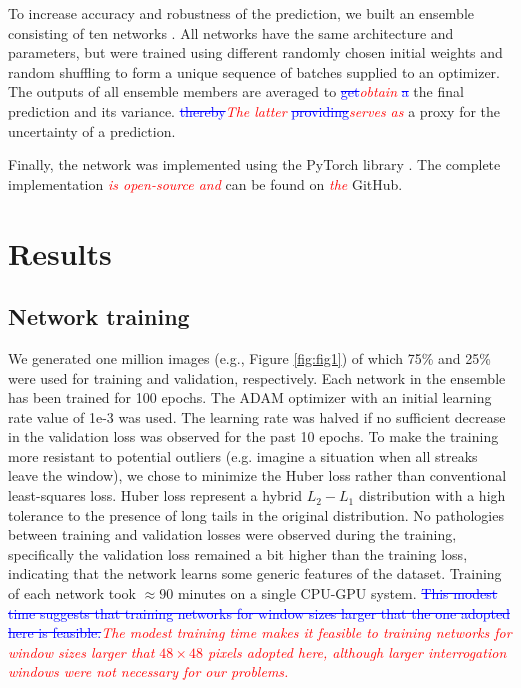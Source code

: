 \documentclass{svjour3}                     %
\newcommand{\new}[1]{\textit{\textcolor{red}{#1}}}
\newcommand{\old}[1]{\textcolor{blue}{\sout{#1}}}
\begin{document}
To increase accuracy and robustness of the prediction, we built an ensemble consisting of ten networks \cite{hinton2015distilling}. All networks have the same architecture and parameters, but were trained using different randomly chosen initial weights \cite{glorot2010understanding, he2015delving} and random shuffling to form a unique sequence of batches supplied to an optimizer. The outputs of all ensemble members are averaged to \old{get}\new{obtain} \old{a} the final prediction and its variance. \old{thereby}\new{The latter} \old{providing}\new{serves as} a proxy for the uncertainty of a prediction.

Finally, the network was implemented using the PyTorch library \cite{paszke2017automatic}. The complete implementation \new{is open-source and} can be found on \new{the} GitHub.

\section{Results}

\subsection{Network training}

We generated one million images (e.g., Figure \ref{fig:fig1}) of which 75\% and 25\% were used for training and validation, respectively. Each network in the ensemble has been trained for 100 epochs. The ADAM optimizer with an initial learning rate value of 1e-3 was used. The learning rate was halved if no sufficient decrease in the validation loss was observed for the past 10 epochs. To make the training more resistant to potential outliers (e.g. imagine a situation when all streaks leave the window), we chose to minimize the Huber loss \cite{huber1973robust} rather than conventional least-squares loss. Huber loss represent a hybrid $L_2-L_1$ distribution with a high tolerance to the presence of long tails in the original distribution. 
No pathologies between training and validation losses were observed during the training, specifically the validation loss remained a bit higher than the training loss, indicating that the network learns some generic features of the dataset. Training of each network took $\approx 90$ minutes on a single CPU-GPU system. \old{This modest time suggests that training networks for window sizes larger that the one adopted here is feasible.}\new{The modest training time makes it feasible to training networks for window sizes larger that $48 \times 48$ pixels adopted here, although larger interrogation windows were not necessary for our problems.}
\end{document}
